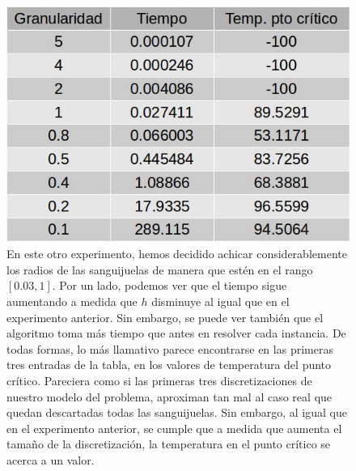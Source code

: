 \begin{figure}[H]
\centering
\includegraphics[scale=0.4]{instancia20x20_2.jpg}\caption{En este otro experimento, hemos decidido achicar considerablemente los radios de las sanguijuelas de manera que estén en el rango $[0.03, 1]$. Por un lado, podemos ver que el tiempo sigue aumentando a medida que $h$ disminuye al igual que en el experimento anterior. Sin embargo, se puede ver también que el algoritmo toma más tiempo que antes en resolver cada instancia. De todas formas, lo más llamativo parece encontrarse en las primeras tres entradas de la tabla, en los valores de temperatura del punto crítico. Pareciera como si las primeras tres discretizaciones de nuestro modelo del problema, aproximan tan mal al caso real que quedan descartadas todas las sanguijuelas. Sin embargo, al igual que en el experimento anterior, se cumple que a medida que aumenta el tamaño de la discretización, la temperatura en el punto crítico se acerca a un valor.}
\end{figure}

